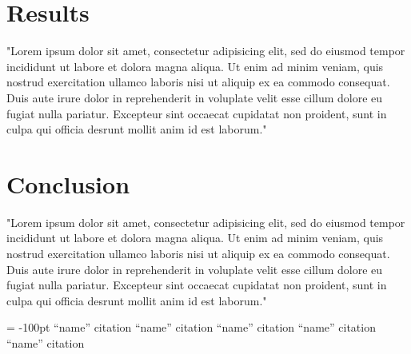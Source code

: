 \documentclass[11pt, twocolumn]{article}
\begin{document}
\section{Results}
"Lorem ipsum dolor sit amet, consectetur adipisicing elit, sed do eiusmod tempor incididunt ut labore et dolora magna aliqua.  Ut enim ad minim veniam, quis nostrud exercitation ullamco laboris nisi ut aliquip ex ea commodo consequat.  Duis aute irure dolor in reprehenderit in voluplate velit esse cillum dolore eu fugiat nulla pariatur.  Excepteur sint occaecat cupidatat non proident, sunt in culpa qui officia desrunt mollit anim id est laborum."

\section{Conclusion}
"Lorem ipsum dolor sit amet, consectetur adipisicing elit, sed do eiusmod tempor incididunt ut labore et dolora magna aliqua.  Ut enim ad minim veniam, quis nostrud exercitation ullamco laboris nisi ut aliquip ex ea commodo consequat.  Duis aute irure dolor in reprehenderit in voluplate velit esse cillum dolore eu fugiat nulla pariatur.  Excepteur sint occaecat cupidatat non proident, sunt in culpa qui officia desrunt mollit anim id est laborum."

\begin{flushleft}
\begin{thebibliography}{99}
\topmargin = -100pt
    ``name''
        citation
    ``name''
        citation
    ``name''
        citation
    ``name''
        citation
    ``name''
        citation
\end{thebibliography}
\end{flushleft}
\end{document}
